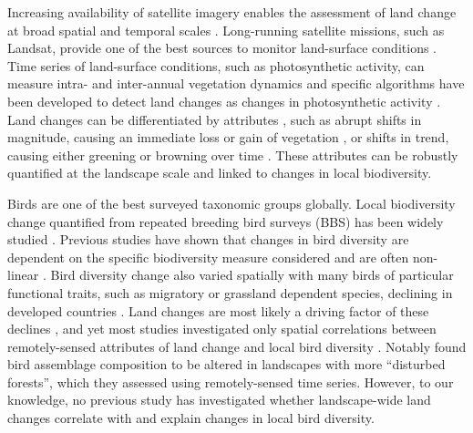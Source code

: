 Increasing availability of satellite imagery enables the assessment of land change at broad spatial and temporal scales \citep{Kennedy2014,Pasquarella2016}. Long-running satellite missions, such as Landsat, provide one of the best sources to monitor land-surface conditions \citep{Kennedy2014,Vogelmann2016,Hermosilla2018,Song2018}. Time series of land-surface conditions, such as photosynthetic activity, can measure intra- and inter-annual vegetation dynamics \citep{Pettorelli2005,Fisher2006} and specific algorithms have been developed to detect land changes as changes in photosynthetic activity \citep{Verbesselt2010,Zhu2017}. Land changes can be differentiated by attributes \citep{Watson2014}, such as abrupt shifts in magnitude, causing an immediate loss or gain of vegetation \citep{DeVries2015b}, or shifts in trend, causing either greening or browning over time \citep{DeJong2013,Muller2014}. These attributes can be robustly quantified at the landscape scale and linked to changes in local biodiversity.

Birds are one of the best surveyed taxonomic groups globally. Local biodiversity change quantified from repeated breeding bird surveys (BBS) has been widely studied \citep{Harrison2014,Pardieck2018}. Previous studies have shown that changes in bird diversity are dependent on the specific biodiversity measure     considered \citep{Schipper2016,Jarzyna2017} and are often non-linear \citep{Gutzwiller2015,Barnagaud2017}. Bird diversity change also varied spatially \citep{Harrison2014,Jarzyna2017} with many birds of particular functional traits, such as migratory or grassland dependent species, declining in developed countries \citep{Fewster2000,Sanderson2006,Stanton2018}. Land changes are most likely a driving factor of these declines \citep{Harrison2014,Harrison2016}, and yet most studies investigated only spatial correlations between remotely-sensed attributes of land change and local bird diversity \citep{Rowhani2008,Goetz2014,Hobi2017}. Notably \cite{Rittenhouse2010} found bird assemblage composition to be altered in landscapes with more “disturbed forests”, which they assessed using remotely-sensed time series. However, to our knowledge, no previous study has investigated whether landscape-wide land changes correlate with and explain changes in local bird diversity.

